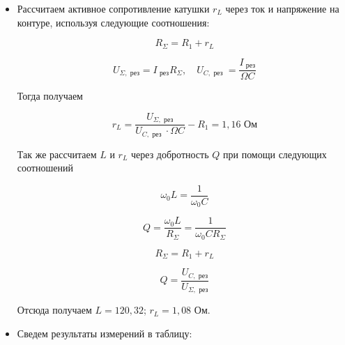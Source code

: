 \documentclass[a4paper, 12pt]{article}%
\begin{document}
\begin{itemize}
\begin{center}
\begin{figure}[!h]
\end{figure}

\end{center}


\item  Рассчитаем активное сопротивление катушки $r_L$ через ток и напряжение
на контуре, используя следующие соотношения:

\[  R_{\Sigma}=R_1 + r_{L} \]

\[  U_{\Sigma, \text{ рез}}=I_{\text{ рез}} R_{\Sigma}, \quad U_{C, \text { рез }}=\frac{I_{\text{ рез}}}{\Omega C} \]

Тогда получаем	

\[r_L = \frac{U_{\Sigma, \text{ рез}}}{U_{C, \text { рез }} \cdot \Omega C} - R_1 = 1,16 \text{ Ом}\]

Так же рассчитаем $L$ и $r_L$ через добротность $Q$ при помощи следующих соотношений 

\[ \omega_{0} L=\frac{1}{\omega_{0} C} \]

\[ Q=\frac{\omega_{0} L}{R_{\Sigma}}=\frac{1}{\omega_{0} C R_{\Sigma}} \]

\[ R_{\Sigma}=R_1 + r_{L} \]

\[ Q=\frac{U_{C, \text{ рез}}}{U_{\Sigma, \text{ рез}}}\]

Отсюда получаем $L = 120,32$; $r_L = 1,08 \text{ Ом}$.

\item Сведем результаты измерений в таблицу:


\end{itemize}
\end{document}

